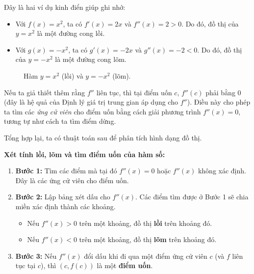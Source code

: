\begin{example}
Đây là hai ví dụ kinh điển giúp ghi nhớ:
\begin{itemize}
    \item Với $f(x) = x^2$, ta có $f'(x) = 2x$ và $f''(x) = 2 > 0$. Do đó, đồ thị của $y=x^2$ là một đường cong lồi.
    \item Với $g(x) = -x^2$, ta có $g'(x) = -2x$ và $g''(x) = -2 < 0$. Do đó, đồ thị của $y=-x^2$ là một đường cong lõm.
\end{itemize}
\begin{figure}[H]
    \centering
    \caption{Hàm $y=x^2$ (lồi) và $y=-x^2$ (lõm).}
    \label{fig:parabola-concavity}
\end{figure}
\end{example}

Nếu ta giả thiết thêm rằng $f''$ liên tục, thì tại điểm uốn $c$, $f''(c)$ phải bằng 0 (đây là hệ quả của Định lý giá trị trung gian áp dụng cho $f''$). Điều này cho phép ta tìm các \textit{ứng cử viên} cho điểm uốn bằng cách giải phương trình $f''(x)=0$, tương tự như cách ta tìm điểm dừng.

Tổng hợp lại, ta có thuật toán sau để phân tích hình dạng đồ thị.

\begin{importantbox}
\textbf{Xét tính lồi, lõm và tìm điểm uốn của hàm số:}
\begin{enumerate}[label={}]
    \item \textbf{Bước 1:} Tìm các điểm mà tại đó $f''(x)=0$ hoặc $f''(x)$ không xác định. Đây là các ứng cử viên cho điểm uốn.
    \item \textbf{Bước 2:} Lập bảng xét dấu cho $f''(x)$. Các điểm tìm được ở Bước 1 sẽ chia miền xác định thành các khoảng.
    \begin{itemize}
        \item Nếu $f''(x) > 0$ trên một khoảng, đồ thị \textbf{lồi} trên khoảng đó.
        \item Nếu $f''(x) < 0$ trên một khoảng, đồ thị \textbf{lõm} trên khoảng đó.
    \end{itemize}
    \item \textbf{Bước 3:} Nếu $f''(x)$ đổi dấu khi đi qua một điểm ứng cử viên $c$ (và $f$ liên tục tại $c$), thì $(c, f(c))$ là một \textbf{điểm uốn}.
\end{enumerate}
\end{importantbox}

